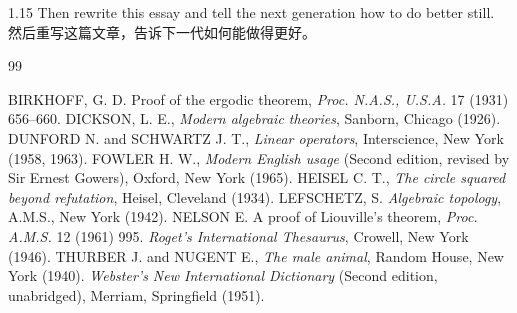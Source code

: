 \documentclass[12pt,a4paper]{article}
\newcommand{\bilingual}[2]{
    \begin{spacing}{1.15} %
        \noindent \normalsize #1 \\[-0.5ex] %
        \small \textcolor{blue!70!black}{#2} %
    \end{spacing}
    \vspace{0.8em} %
}
\begin{document}
\bilingual{Then rewrite this essay and tell the next generation how to do better still.}
{然后重写这篇文章，告诉下一代如何能做得更好。} %

\renewcommand\refname{REFERENCES / 参考文献} %
\begin{thebibliography}{99} %

 BIRKHOFF, G. D. Proof of the ergodic theorem, \textit{Proc. N.A.S., U.S.A.} 17 (1931) 656--660. %
 DICKSON, L. E., \textit{Modern algebraic theories}, Sanborn, Chicago (1926). %
 DUNFORD N. and SCHWARTZ J. T., \textit{Linear operators}, Interscience, New York (1958, 1963). %
 FOWLER H. W., \textit{Modern English usage} (Second edition, revised by Sir Ernest Gowers), Oxford, New York (1965). %
 HEISEL C. T., \textit{The circle squared beyond refutation}, Heisel, Cleveland (1934). %
 LEFSCHETZ, S. \textit{Algebraic topology}, A.M.S., New York (1942). %
 NELSON E. A proof of Liouville's theorem, \textit{Proc. A.M.S.} 12 (1961) 995. %
 \textit{Roget's International Thesaurus}, Crowell, New York (1946). %
 THURBER J. and NUGENT E., \textit{The male animal}, Random House, New York (1940). %
 \textit{Webster's New International Dictionary} (Second edition, unabridged), Merriam, Springfield (1951). %

\end{thebibliography} %
\end{document}
